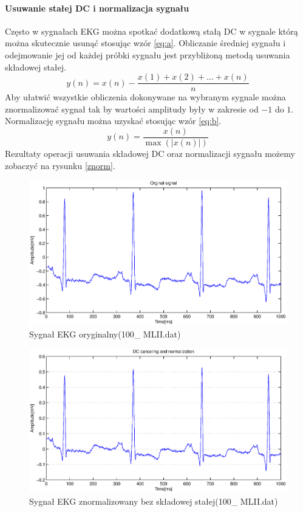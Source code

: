 \documentclass[a4paper, 11pt]{article}
\begin{document}
\paragraph{Usuwanie stałej DC i normalizacja sygnału}
Często w sygnałach EKG można spotkać dodatkową stałą DC w sygnale którą można skutecznie usunąć stosując wzór
\eqref{eq:a}. Obliczanie średniej sygnału i odejmowanie jej od każdej próbki sygnału jest przybliżoną metodą usuwania składowej stałej.
\begin{equation}
y(n) = x(n)-\frac{x(1)+x(2)+...+x(n)}{n} \label{eq:a}
\end{equation}
\indent Aby ułatwić wszystkie obliczenia dokonywane na wybranym sygnale można znormalizować sygnał tak by wartości amplitudy były w zakresie od $-1$ do $1$. Normalizację sygnału można uzyskać stosując wzór \eqref{eq:b}.
\begin{equation}
y(n) = \frac{x(n)}{\max(|x(n)|)} \label{eq:b} 
\end{equation}
\indent Rezultaty operacji usuwania składowej DC oraz normalizacji sygnału możemy zobaczyć na rysunku \eqref{znorm}.
\begin{figure}[h]
\centering
\includegraphics[scale=0.5]{include/surowy.eps}
\caption{Sygnał EKG oryginalny(100\_ MLII.dat)}
\label{surowy}
\end{figure}
\begin{figure}[h]
\centering
\includegraphics[scale=0.5]{include/znormalizowany.eps}
\caption{Sygnał EKG znormalizowany bez składowej stałej(100\_ MLII.dat)}
\label{znorm}
\end{figure}
\end{document}

